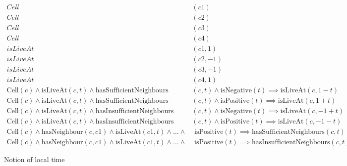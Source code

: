 \documentclass[a4paper]{article}
\begin{document}
\begin{figure}[H]
	\centering
	\begin{align*}
	Cell&(c1) \\
	Cell&(c2) \\
	Cell&(c3) \\
	Cell&(c4) \\
	isLiveAt&(c1, 1) \\
	isLiveAt&(c2, -1) \\
	isLiveAt&(c3, -1) \\
	isLiveAt&(c4, 1) \\
	\text{Cell}(c) \land \text{isLiveAt}(c, t) \land \text{hasSufficientNeighbours}&(c, t) \land \text{isNegative}(t) \implies \text{isLiveAt}(c, 1-t) \\
	\text{Cell}(c) \land \text{isLiveAt}(c, t) \land \text{hasSufficientNeighbours}&(c, t) \land \text{isPositive}(t) \implies \text{isLiveAt}(c, 1+t) \\
	\text{Cell}(c) \land \text{isLiveAt}(c, t) \land \text{hasInsufficientNeighbours}&(c, t) \land \text{isNegative}(t) \implies \text{isLiveAt}(c, -1+t) \\
	\text{Cell}(c) \land \text{isLiveAt}(c, t) \land \text{hasInsufficientNeighbours}&(c, t) \land \text{isPositive}(t) \implies \text{isLiveAt}(c, -1-t) \\
	\text{Cell}(c) \land \text{hasNeighbour}(c, c1) \land \text{isLiveAt}(c1, t) \land \dots \land &\text{ isPositive}(t) \implies \text{hasSufficientNeighbours}(c, t) \\
	\text{Cell}(c) \land \text{hasNeighbour}(c, c1) \land \text{isLiveAt}(c1, t) \land \dots \land &\text{ isPositive}(t) \implies \text{hasInsufficientNeighbours}(c, t)
	\end{align*}
	\caption{Notion of local time}
\end{figure}
\end{document}
